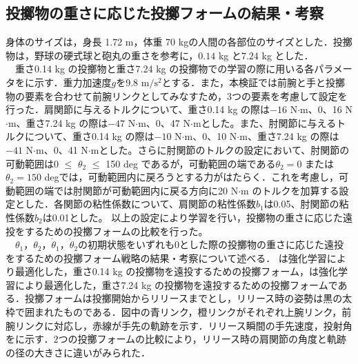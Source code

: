 \begin{small}
\subsection{投擲物の重さに応じた投擲フォームの結果・考察}
身体のサイズは，身長 1.72 m，体重 70 kgの人間の各部位のサイズとした．投擲物は，野球の硬式球と砲丸の重さを参考に，$0.14$ kg\cite{horiuchi} と$7.24$ kg\cite{haq} とした．\\
　重さ0.14 kg の投擲物と重さ7.24 kg の投擲物での学習の際に用いる各パラメータをに示す\cite{irving}．重力加速度$g$を9.8 $\mathrm{m/s^{2}}$とする．また，本検証では前腕と手と投擲物の要素を合わせて前腕リンクとしてみなすため，3つの要素を考慮して設定を行った．肩関節に与えるトルクについて、重さ0.14 kg の際は$-16$ N$\cdot$m、0、16 N$\cdot$m、重さ7.24 kg の際は$-47$ N$\cdot$m、0、47 N$\cdot$mとした。また、肘関節に与えるトルクについて、重さ0.14 kg の際は$-10$ N$\cdot$m、0、10 N$\cdot$m、重さ7.24 kg の際は$-41$ N$\cdot$m、0、41 N$\cdot$mとした。さらに肘関節のトルクの設定において、肘関節の可動範囲は0 $\le$ $\theta_{2}$ $\le$ 150 deg であるが，可動範囲の端である$\theta_{2} = 0$ または $\theta_{2} = 150$ degでは，可動範囲内に戻ろうとする力がはたらく．これを考慮し，可動範囲の端では肘関節が可動範囲内に戻る方向に20 N$\cdot$m のトルクを加算する設定とした．各関節の粘性係数について、肩関節の粘性係数$b_{1}$は0.05、肘関節の粘性係数$b_{2}$は0.01とした。
以上の設定により学習を行い，投擲物の重さに応じた遠投をするための投擲フォームの比較を行った。\\
　$\theta_{1}$，$\theta_{2}$，$\dot{\theta}_{1}$，$\dot{\theta}_{2}$の初期状態をいずれも0とした際の投擲物の重さに応じた遠投をするための投擲フォーム戦略の結果・考察について述べる．
は強化学習により最適化した，重さ0.14 kg の投擲物を遠投するための投擲フォーム，は強化学習により最適化した，重さ7.24 kg の投擲物を遠投するための投擲フォームである．投擲フォームは投擲開始からリリースまでとし，リリース時の姿勢は黒の太枠で囲まれたものである．図中の青リンク，橙リンクがそれぞれ上腕リンク，前腕リンクに対応し，赤線が手先の軌跡を示す．リリース瞬間の手先速度，投射角をに示す．2つの投擲フォームの比較により，リリース時の肩関節の角度と軌跡の径の大きさに違いがみられた．\\

\end{small}
